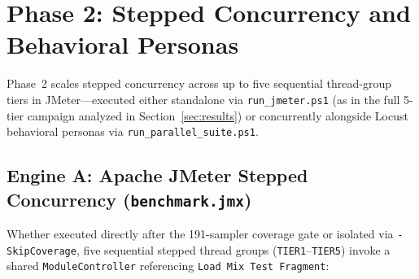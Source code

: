 \documentclass[11pt,letterpaper]{article}
\begin{document}
\section{Phase 2: Stepped Concurrency and Behavioral Personas}

Phase~2 scales stepped concurrency across up to five sequential thread-group tiers in JMeter—executed either standalone via \texttt{run\_jmeter.ps1} (as in the full 5-tier campaign analyzed in Section~\ref{sec:results}) or concurrently alongside Locust behavioral personas via \texttt{run\_parallel\_suite.ps1}.

\subsection{Engine A: Apache JMeter Stepped Concurrency (\texttt{benchmark.jmx})}
Whether executed directly after the 191-sampler coverage gate or isolated via \texttt{-SkipCoverage}, five sequential stepped thread groups (\texttt{TIER1}--\texttt{TIER5}) invoke a shared \texttt{ModuleController} referencing \texttt{Load Mix Test Fragment}:
\end{document}
